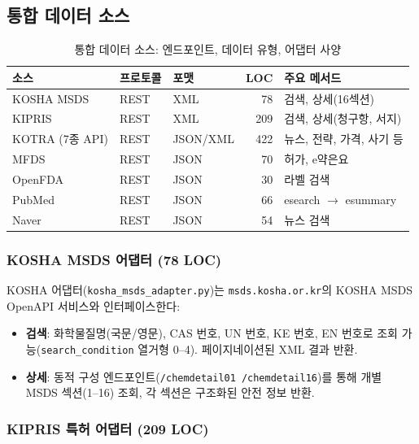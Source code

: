 \documentclass[preprint,12pt]{elsarticle}
\begin{document}
\subsection{통합 데이터 소스}
\label{sec:datasources}

\begin{table}[H]
\centering
\caption{통합 데이터 소스: 엔드포인트, 데이터 유형, 어댑터 사양}
\label{tab:sources_detail}
\small
\begin{tabular}{@{}lllrl@{}}
\toprule
\textbf{소스} & \textbf{프로토콜} & \textbf{포맷} & \textbf{LOC} & \textbf{주요 메서드} \\
\midrule
KOSHA MSDS & REST & XML & 78 & 검색, 상세(16섹션) \\
KIPRIS & REST & XML & 209 & 검색, 상세(청구항, 서지) \\
KOTRA (7종 API) & REST & JSON/XML & 422 & 뉴스, 전략, 가격, 사기 등 \\
MFDS & REST & JSON & 70 & 허가, e약은요 \\
OpenFDA & REST & JSON & 30 & 라벨 검색 \\
PubMed & REST & JSON & 66 & esearch $\rightarrow$ esummary \\
Naver & REST & JSON & 54 & 뉴스 검색 \\
\bottomrule
\end{tabular}
\end{table}

\subsubsection{KOSHA MSDS 어댑터 (78 LOC)}

KOSHA 어댑터(\texttt{kosha\_msds\_adapter.py})는 \texttt{msds.kosha.or.kr}의 KOSHA MSDS OpenAPI 서비스와 인터페이스한다:

\begin{itemize}
  \item \textbf{검색}: 화학물질명(국문/영문), CAS 번호, UN 번호, KE 번호, EN 번호로 조회 가능(\texttt{search\_condition} 열거형 0--4). 페이지네이션된 XML 결과 반환.
  \item \textbf{상세}: 동적 구성 엔드포인트(\texttt{/chemdetail01}~\texttt{/chemdetail16})를 통해 개별 MSDS 섹션(1--16) 조회, 각 섹션은 구조화된 안전 정보 반환.
\end{itemize}

\subsubsection{KIPRIS 특허 어댑터 (209 LOC)}
\end{document}
